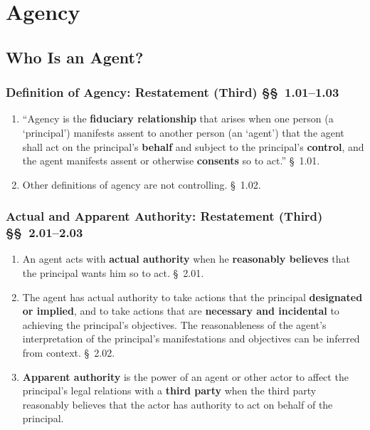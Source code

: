 \section{Agency}

\subsection{Who Is an Agent?}

\subsubsection{Definition of Agency: Restatement (Third) \S\S\ 1.01--1.03}

\begin{enumerate}
    \item ``Agency is the \textbf{fiduciary relationship} that arises when one 
    person (a `principal') manifests assent to another person (an `agent') 
    that the agent shall act on the principal's \textbf{behalf} and subject to 
    the principal's \textbf{control}, and the agent manifests assent or 
    otherwise \textbf{consents} so to act.'' \S\ 1.01.
    \item Other definitions of agency are not controlling. \S\ 1.02.
\end{enumerate}

\subsubsection{Actual and Apparent Authority: Restatement (Third) \S\S\ 
2.01--2.03}

\begin{enumerate}
    \item An agent acts with \textbf{actual authority} when he 
    \textbf{reasonably believes} that the principal wants him so to act. \S\ 
    2.01.
    \item The agent has actual authority to take actions that the principal 
    \textbf{designated or implied}, and to take actions that are 
    \textbf{necessary and incidental} to achieving the principal's objectives. 
    The reasonableness of the agent's interpretation of the principal's 
    manifestations and objectives can be inferred from context. \S\ 2.02.
    \item \textbf{Apparent authority} is the power of an agent or other actor 
    to affect the principal's legal relations with a \textbf{third party} when 
    the third party reasonably believes that the actor has authority to act on 
    behalf of the principal.
\end{enumerate}

